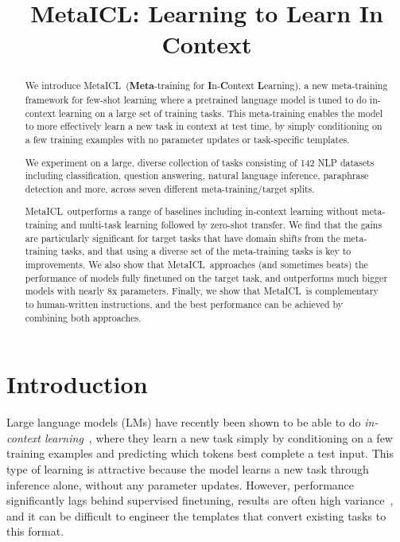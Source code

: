 \title{MetaICL: Learning to Learn In Context}

\begin{abstract}
We introduce MetaICL\ (\textbf{Meta}-training for \textbf{I}n-\textbf{C}ontext \textbf{L}earning), a new meta-training framework for few-shot learning where a pretrained language model is tuned to do in-context learning on a large set of training tasks. This meta-training enables the model to more effectively learn a new task in context at test time, by simply conditioning on a few training examples with no parameter updates or task-specific templates.

We experiment on a large, diverse collection of tasks consisting of 142 NLP datasets including classification, question answering, natural language inference, paraphrase detection and more, across seven different meta-training/target splits.

MetaICL\ outperforms a range of baselines including in-context learning without meta-training and multi-task learning followed by zero-shot transfer. We find that the gains are particularly significant for target tasks that have domain shifts from the meta-training tasks, and that using a diverse set of the meta-training tasks is key to improvements. We also show that MetaICL\ approaches (and sometimes beats) the performance of models fully finetuned on the target task, and outperforms much bigger models with nearly 8x parameters. Finally, we show that MetaICL\ is complementary to human-written instructions, and the best performance can be achieved by combining both approaches.
\end{abstract}

\section{Introduction}\label{sec:intro}

Large language models (LMs) have recently been shown to be able to do {\em in-context learning}~\citep{brown2020language}, where they learn a new task simply by conditioning on a few training examples and predicting which tokens best complete a test input. This type of learning is attractive because the model learns a new task through inference alone, without any parameter updates. However, performance significantly lags behind supervised finetuning, results are often high variance~\citep{zhao2021calibrate,perez2021true}, and it can be difficult to engineer the templates that convert existing tasks to this format. 

